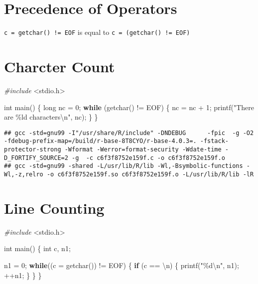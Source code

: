 \documentclass[
]{book}
\newenvironment{Shaded}{\begin{snugshade}}{\end{snugshade}}
\newcommand{\CharTok}[1]{\textcolor[rgb]{0.31,0.60,0.02}{#1}}
\newcommand{\ControlFlowTok}[1]{\textcolor[rgb]{0.13,0.29,0.53}{\textbf{#1}}}
\newcommand{\DataTypeTok}[1]{\textcolor[rgb]{0.13,0.29,0.53}{#1}}
\newcommand{\DecValTok}[1]{\textcolor[rgb]{0.00,0.00,0.81}{#1}}
\newcommand{\ImportTok}[1]{#1}
\newcommand{\NormalTok}[1]{#1}
\newcommand{\PreprocessorTok}[1]{\textcolor[rgb]{0.56,0.35,0.01}{\textit{#1}}}
\newcommand{\SpecialCharTok}[1]{\textcolor[rgb]{0.00,0.00,0.00}{#1}}
\newcommand{\StringTok}[1]{\textcolor[rgb]{0.31,0.60,0.02}{#1}}
\begin{document}
\hypertarget{precedence-of-operators}{%
\section{Precedence of Operators}\label{precedence-of-operators}}

\texttt{c\ =\ getchar()\ !=\ EOF} is equal to \texttt{c\ =\ (getchar()\ !=\ EOF)}

\hypertarget{charcter-count}{%
\section{Charcter Count}\label{charcter-count}}

\begin{Shaded}
\begin{Highlighting}[]
\PreprocessorTok{\#include }\ImportTok{\textless{}stdio.h\textgreater{}}

\DataTypeTok{int}\NormalTok{ main()}
\NormalTok{\{}
    \DataTypeTok{long}\NormalTok{ nc = }\DecValTok{0}\NormalTok{;}
    \ControlFlowTok{while}\NormalTok{ (getchar() != EOF)}
\NormalTok{    \{}
\NormalTok{        nc = nc + }\DecValTok{1}\NormalTok{;}
\NormalTok{        printf(}\StringTok{"There are \%ld characters}\SpecialCharTok{\textbackslash{}n}\StringTok{"}\NormalTok{, nc);}
\NormalTok{    \}}
\NormalTok{\}}
\end{Highlighting}
\end{Shaded}

\begin{verbatim}
## gcc -std=gnu99 -I"/usr/share/R/include" -DNDEBUG      -fpic  -g -O2 -fdebug-prefix-map=/build/r-base-8T8CYO/r-base-4.0.3=. -fstack-protector-strong -Wformat -Werror=format-security -Wdate-time -D_FORTIFY_SOURCE=2 -g  -c c6f3f8752e159f.c -o c6f3f8752e159f.o
## gcc -std=gnu99 -shared -L/usr/lib/R/lib -Wl,-Bsymbolic-functions -Wl,-z,relro -o c6f3f8752e159f.so c6f3f8752e159f.o -L/usr/lib/R/lib -lR
\end{verbatim}

\hypertarget{line-counting}{%
\section{Line Counting}\label{line-counting}}

\begin{Shaded}
\begin{Highlighting}[]
\PreprocessorTok{\#include }\ImportTok{\textless{}stdio.h\textgreater{}}

\DataTypeTok{int}\NormalTok{ main()}
\NormalTok{\{}
    \DataTypeTok{int}\NormalTok{ c, n1;}

\NormalTok{    n1 = }\DecValTok{0}\NormalTok{;}
    \ControlFlowTok{while}\NormalTok{((c = getchar()) != EOF)}
\NormalTok{    \{}
        \ControlFlowTok{if}\NormalTok{ (c == }\CharTok{\textquotesingle{}\textbackslash{}n\textquotesingle{}}\NormalTok{)}
\NormalTok{        \{}
\NormalTok{            printf(}\StringTok{"\%d}\SpecialCharTok{\textbackslash{}n}\StringTok{"}\NormalTok{, n1);}
\NormalTok{            ++n1;}
\NormalTok{        \}}
\NormalTok{    \}}
\NormalTok{\}}
\end{Highlighting}
\end{Shaded}
\end{document}
